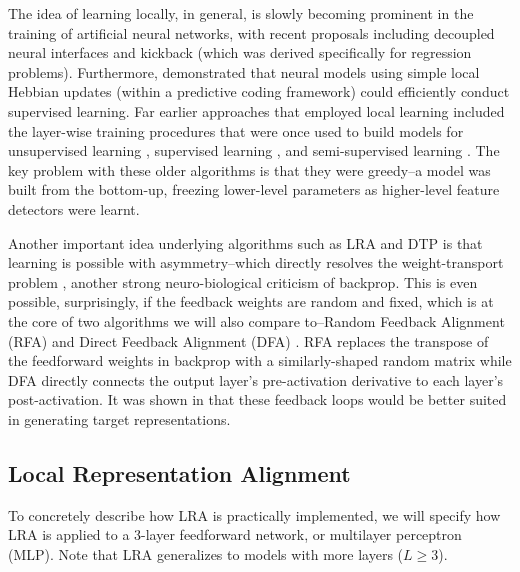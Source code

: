 \documentclass[letterpaper]{article} %
\begin{document}
The idea of learning locally, in general, is slowly becoming prominent in the training of artificial neural networks, with recent proposals including decoupled neural interfaces \cite{jaderberg2016decoupled} and kickback \cite{balduzzi2015kickback} (which was derived specifically for regression problems). Furthermore, \cite{whittington2017equivalence} demonstrated that neural models using simple local Hebbian updates (within a predictive coding framework) could efficiently conduct supervised learning. Far earlier approaches that employed local learning included the layer-wise training procedures that were once used to build models for unsupervised learning \cite{bengio_greedy_2007}, supervised learning \cite{lee_deeply-supervised_2014}, and semi-supervised learning \cite{ororbia_deep_hybrid_2015a,ororbia2015online}.  The key problem with these older algorithms is that they were greedy--a model was built from the bottom-up, freezing lower-level parameters as higher-level feature detectors were learnt.



Another important idea underlying algorithms such as LRA and DTP is that learning is possible with asymmetry--which directly resolves the weight-transport problem \cite{grossberg_resonance_1987,liao2016important}, another strong neuro-biological criticism of backprop. This is even possible, surprisingly, if the feedback weights are random and fixed, which is at the core of two algorithms we will also compare to--Random Feedback Alignment (RFA) \cite{lillicrap2016random} and Direct Feedback Alignment (DFA) \cite{nokland2016direct}. RFA replaces the transpose of the feedforward weights in backprop with a similarly-shaped random matrix while DFA directly connects the output layer's pre-activation derivative to each layer's post-activation. It was shown in \cite{ororbia2017learning,ororbia2018conducting} that these feedback loops would be better suited in generating target representations.%

\subsection{Local Representation Alignment}
\label{lra}
To concretely describe how LRA is practically implemented, we will specify how LRA is applied to a 3-layer feedforward network, or multilayer perceptron (MLP). Note that LRA generalizes to models with more layers ($L \geq 3$).
\end{document}
